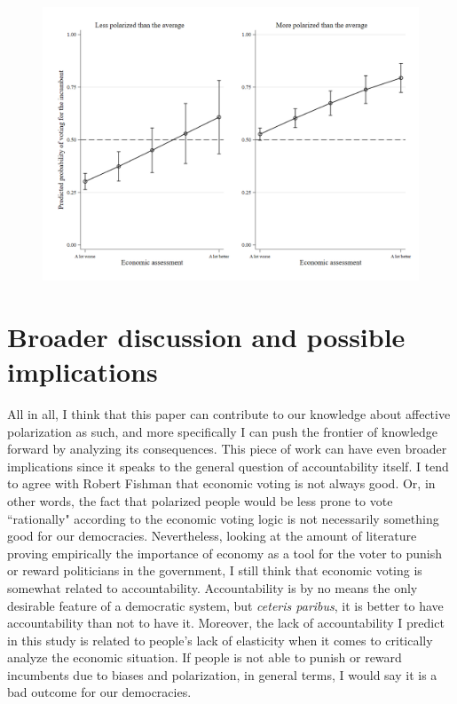\documentclass[a4paper, svgnames]{article}
\begin{document}
\begin{figure}[H]
\centering
\includegraphics[scale=0.35]{Figures/marginsplot.png}
\end{figure}


\section{Broader discussion and possible implications}

All in all, I think that this paper can contribute to our knowledge about affective polarization as such, and more specifically I can push the  frontier of knowledge forward by analyzing its consequences. This piece of work can have even broader implications since it speaks to the general question of accountability itself. I tend to agree with Robert Fishman that economic voting is not always good. Or, in other words, the fact that polarized people would be less prone to vote ``rationally" according to the economic voting logic is not necessarily something good for our democracies. Nevertheless, looking at the amount of literature proving empirically the importance of economy as a tool for the voter to punish or reward politicians in the government, I still think that economic voting is somewhat related to accountability. Accountability is by no means the only desirable feature of a democratic system, but \textit{ceteris paribus}, it is better to have accountability than not to have it. Moreover, the lack of accountability I predict in this study is related to people's lack of elasticity when it comes to critically analyze the economic situation. If people is not able to punish or reward incumbents due to biases and polarization, in general terms, I would say it is a bad outcome for our democracies.
\end{document}
